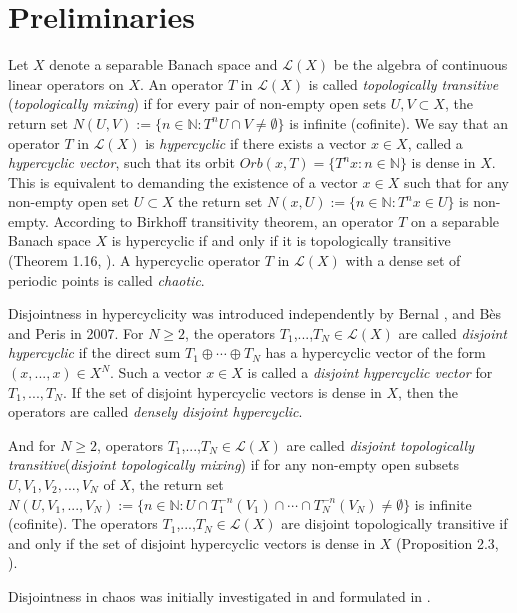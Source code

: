 \documentclass{article}
\begin{document}
\section{Preliminaries}
Let $X$ denote a separable Banach space and $\mathcal{L}(X)$ be the algebra of continuous linear operators on $X$.
An operator $T$ in $\mathcal{L}(X)$ is called \textit{topologically transitive} (\textit{topologically mixing}) if for every pair of non-empty open sets $U, V\subset X$, the return set $N(U,V):=\{n\in\mathbb{N}: T^{n}U\cap V\neq \emptyset\}$ is infinite (cofinite).
We say that an operator $T$ in $\mathcal{L}(X)$ is \textit{hypercyclic} if there exists a vector $x \in X$, called a \textit{hypercyclic vector}, such that its orbit $ Orb(x, T) =\{T^{n}x:n\in {\mathbb N} \}$ is dense in $X$. This is equivalent to demanding the existence of a vector $x \in X$ such that for any non-empty open set $U \subset X$ the return set $N(x,U) := \{n \in {\mathbb{N}}:T^{n}x \in U \}$ is non-empty. According to Birkhoff transitivity theorem, an operator $T$ on a separable Banach space $X$ is hypercyclic if and only if it is topologically transitive (Theorem 1.16, \cite{GM11}). A hypercyclic operator $T$ in $\mathcal{L}(X)$ with a dense set of periodic points  is called \textit{chaotic}.

Disjointness in hypercyclicity was introduced independently by Bernal \cite{B07}, and B\`{e}s and Peris \cite{BP07} in 2007.
For $N\geq 2$, the operators $T_{1}$,...,$T_{N}\in \mathcal{L}(X)$ are called \textit{disjoint hypercyclic} if the direct sum $T_{1}\oplus \cdots \oplus T_{N}$ has a hypercyclic vector of the form $(x,...,x)\in X^{N}$. Such a vector $x\in X$ is called a \textit{disjoint hypercyclic vector} for $T_{1},...,T_{N}$. If the set of disjoint hypercyclic vectors is dense in $X$, then the operators are called \textit{densely disjoint hypercyclic}.

And for $N\geq 2$, operators $T_{1}$,...,$T_{N}\in \mathcal{L}(X)$ are called \textit{disjoint topologically transitive}(\textit{disjoint topologically mixing}) if for any non-empty open subsets $U, V_{1}, V_{2},...,V_{N}$ of $X$, the return set $N(U,V_{1}, ..., V_{N}) :=\{n\in\mathbb{N}: U\cap T^{-n}_{1}(V_{1})\cap\cdots\cap T^{-n}_{N}(V_{N})\neq \emptyset\}$ is infinite (cofinite).
The operators $T_{1}$,...,$T_{N}\in \mathcal{L}(X)$ are disjoint topologically transitive if and only if the set of disjoint hypercyclic vectors is dense in $X$ (Proposition 2.3, \cite{BP07}).

Disjointness in chaos was initially investigated in \cite{CKP18} and formulated in \cite{CK23}.
\end{document}
